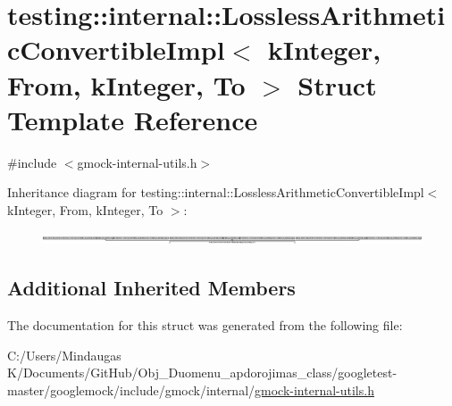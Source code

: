\hypertarget{structtesting_1_1internal_1_1_lossless_arithmetic_convertible_impl_3_01k_integer_00_01_from_00_01k_integer_00_01_to_01_4}{}\section{testing\+::internal\+::Lossless\+Arithmetic\+Convertible\+Impl$<$ k\+Integer, From, k\+Integer, To $>$ Struct Template Reference}
\label{structtesting_1_1internal_1_1_lossless_arithmetic_convertible_impl_3_01k_integer_00_01_from_00_01k_integer_00_01_to_01_4}


{\ttfamily \#include $<$gmock-\/internal-\/utils.\+h$>$}

Inheritance diagram for testing\+::internal\+::Lossless\+Arithmetic\+Convertible\+Impl$<$ k\+Integer, From, k\+Integer, To $>$\+:\begin{figure}[H]
\begin{center}
\leavevmode
\includegraphics[height=0.306262cm]{d5/db6/structtesting_1_1internal_1_1_lossless_arithmetic_convertible_impl_3_01k_integer_00_01_from_00_01k_integer_00_01_to_01_4}
\end{center}
\end{figure}
\subsection*{Additional Inherited Members}


The documentation for this struct was generated from the following file\+:\begin{DoxyCompactItemize}
\item 
C\+:/\+Users/\+Mindaugas K/\+Documents/\+Git\+Hub/\+Obj\+\_\+\+Duomenu\+\_\+apdorojimas\+\_\+class/googletest-\/master/googlemock/include/gmock/internal/\mbox{\hyperlink{googletest-master_2googlemock_2include_2gmock_2internal_2gmock-internal-utils_8h}{gmock-\/internal-\/utils.\+h}}\end{DoxyCompactItemize}
